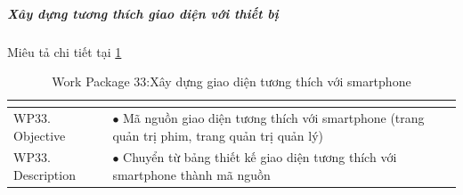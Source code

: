 \documentclass[a4paper]{book}
\begin{document}
\subparagraph{Xây dựng tương thích giao diện với thiết bị} Miêu tả chi tiết tại \ref{table:backend_xd_gd_tuongthich}
\begin{table}[h!]
	\begin{center}
		\begin{tabular}{|p{4cm}|p{10cm}|}
			\hline
			\multicolumn{2}{|c|}{\cellcolor[HTML]{363636}{\color[HTML]{FFFFFF}Work package 33: Xây dựng giao diện tương thích với smartphone}}\\
			\hline
			\multirow{1}{*}{WP33. Objective} & $\bullet$ Mã nguồn giao diện tương thích với smartphone (trang quản trị phim, trang quản trị quản lý)\\
			\hline
			\multirow{1}{*}{WP33. Description} & $\bullet$ Chuyển từ bảng thiết kế giao diện tương thích với smartphone thành mã nguồn \\
			\hline
		\end{tabular}
		\caption{Work Package 33:Xây dựng giao diện tương thích với smartphone}
		\label{table:backend_xd_gd_tuongthich}
	\end{center}
\end{table}
\end{document}
